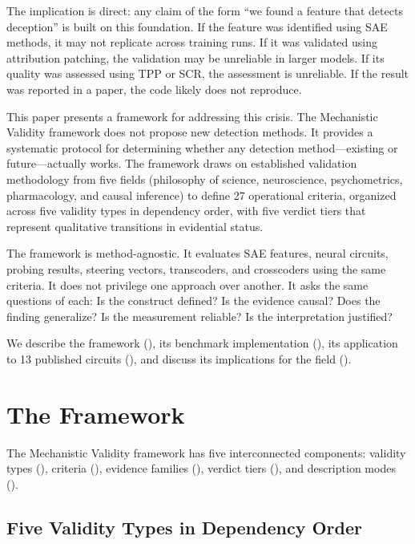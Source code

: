 \documentclass[10pt]{article}
\begin{document}
The implication is direct: any claim of the form ``we found a feature that detects deception'' is built on this foundation. If the feature was identified using SAE methods, it may not replicate across training runs. If it was validated using attribution patching, the validation may be unreliable in larger models. If its quality was assessed using TPP or SCR, the assessment is unreliable. If the result was reported in a paper, the code likely does not reproduce.

This paper presents a framework for addressing this crisis. The Mechanistic Validity framework does not propose new detection methods. It provides a systematic protocol for determining whether any detection method---existing or future---actually works. The framework draws on established validation methodology from five fields (philosophy of science, neuroscience, psychometrics, pharmacology, and causal inference) to define 27 operational criteria, organized across five validity types in dependency order, with five verdict tiers that represent qualitative transitions in evidential status.

The framework is method-agnostic. It evaluates SAE features, neural circuits, probing results, steering vectors, transcoders, and crosscoders using the same criteria. It does not privilege one approach over another. It asks the same questions of each: Is the construct defined? Is the evidence causal? Does the finding generalize? Is the measurement reliable? Is the interpretation justified?

We describe the framework (), its benchmark implementation (), its application to 13 published circuits (), and discuss its implications for the field ().

\section{The Framework}
\label{sec:framework}

The Mechanistic Validity framework has five interconnected components: validity types (), criteria (), evidence families (), verdict tiers (), and description modes ().

\subsection{Five Validity Types in Dependency Order}
\label{sec:validity-types}
\end{document}
